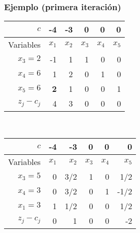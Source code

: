 \documentclass{beamer}
\begin{document}
\begin{frame}
\frametitle{Ejemplo (primera iteración)}


\begin{center}
\begin{tabular}{r | rrrrr}
$c$ & -4 & -3 & 0 & 0 & 0 \\ \hline
Variables & $x_1$ & $x_2$ & $x_3$ & $x_4$ & $x_5$ \\ \hline
$x_3 = 2$ & -1 & 1 & 1 & 0 & 0 \\
$x_4=6$   & 1 & 2 & 0 & 1 & 0  \\
$x_5=6$ & \textbf{2} & 1 & 0 & 0 & 1 \\ \hline
$z_j-c_j$ & 4 & 3 & 0 & 0 & 0 
\end{tabular}
\end{center}


\

\begin{center}
\begin{tabular}{r | rrrrr}
$c$ & -4 & -3 & 0 & 0 & 0 \\ \hline
Variables & $x_1$ & $x_2$ & $x_3$ & $x_4$ & $x_5$ \\ \hline
$x_3=5$ & 0 & 3/2 & 1 & 0 & 1/2 \\
$x_4=3$   & 0 & 3/2 & 0 & 1 & -1/2  \\
$x_1=3$ & 1 & 1/2 & 0 & 0 & 1/2 \\ \hline
$z_j-c_j$ &  0 & 1 & 0 & 0 & -2 
\end{tabular}
\end{center}

\end{frame}
\end{document}
